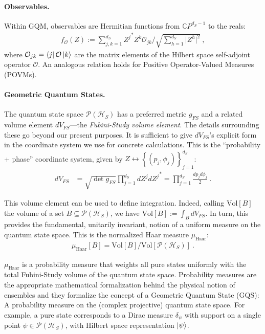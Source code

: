 \documentclass[draft,nofootinbib,pre,twocolumn,showpacs,showkeys,groupaddress,preprintnumbers,floatfix]{revtex4-1}
\newcommand{\1}{\mathbbm{1}}
\newcommand{\CP}[1]{\mathbb{C}P^{#1}}
\begin{document}
\paragraph*{Observables.} Within GQM, observables are Hermitian functions from
$\CP{d_S-1}$ to the reals:
\begin{align*}
f_{\mathcal{O}}(Z):= \sum_{j,k=1}^{d_S} {Z^j}^{*}Z^k \mathcal{O}_{jk}/\sqrt{\sum_{h=1}^{d_S}\vert Z^h \vert^2}
  ~,
\end{align*}
where $\mathcal{O}_{jk} = \bra{j}\mathcal{O}\ket{k}$ are the matrix elements of
the Hilbert space self-adjoint operator $\mathcal{O}$. An analogous relation
holds for Positive Operator-Valued Measures (POVMs).

\paragraph*{Geometric Quantum States.} The quantum state space
$\mathcal{P}(\mathcal{H}_S)$ has a preferred metric $g_{FS}$ and a related
volume element $dV_{FS}$---the \emph{Fubini-Study volume element}. The details
surrounding these go beyond our present purposes. It is sufficient to give
$dV_{FS}$'s explicit form in the coordinate system we use for concrete
calculations. This is the  ``probability + phase'' coordinate system, given by $Z \leftrightarrow \left\{ (p_j,\phi_j)\right\}_{j=1}^{d_S}$: 
\begin{align*}
dV_{FS} & = \sqrt{\det g_{FS}} \prod_{j=1}^{d_S}
  dZ^j {dZ^j}^{*}  =  \prod_{j=1}^{d_S} \frac{dp_j d\phi_j}{2}
  ~.
\end{align*}

This volume element can be used to define integration. Indeed, calling
$\mathrm{Vol}[B]$ the volume of a set $B \subseteq \mathcal{P}(\mathcal{H}_S)$,
we have $\mathrm{Vol}[B]:=\int_B dV_{FS}$. In turn, this provides the
fundamental, unitarily invariant, notion of a uniform measure on the quantum
state space. This is the normalized Haar measure $\mu_{\mathrm{Haar}}$:
\begin{align*}
\mu_{\mathrm{Haar}}[B]
  = \mathrm{Vol}[B]/\mathrm{Vol}[\mathcal{P}(\mathcal{H}_S)]
  ~.
\end{align*}

$\mu_{\mathrm{Haar}}$ is a probability measure that weights all pure states
uniformly with the total Fubini-Study volume of the quantum state space.
Probability measures \cite{Pollard02,Kolmogorov1933} are the appropriate
mathematical formalization behind the physical notion of ensembles and they
formalize the concept of a Geometric Quantum State (GQS): A probability measure
on the (complex projective) quantum state space. For example, a pure state 
corresponds to a Dirac measure $\delta_{\psi}$ with support on a single point 
$\psi \in \mathcal{P}(\mathcal{H}_S)$, with Hilbert space representation $\ket{\psi}$.
\end{document}
